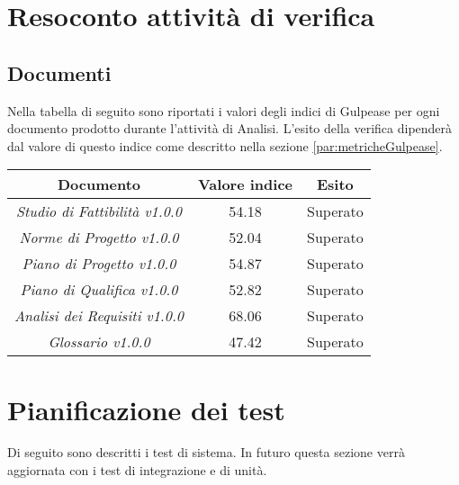 \documentclass{scalatekids-article}
\begin{document}
\section{Resoconto attività di verifica}
\label{sec:resAttivitaVerifica}
\subsection{Documenti}
Nella tabella di seguito sono riportati i valori degli indici di Gulpease per ogni documento prodotto durante l'attività di Analisi. L'esito della verifica dipenderà dal valore di questo indice come descritto nella sezione \ref{par:metricheGulpease}.
\begin{center}
  \begin{tabular}{| c | c | c |}
    \hline
    Documento & Valore indice & Esito\\
    \hline
    \textit{Studio di Fattibilità v1.0.0} & 54.18 & Superato\\
    \textit{Norme di Progetto v1.0.0} & 52.04 & Superato\\
    \textit{Piano di Progetto v1.0.0} & 54.87 & Superato\\
    \textit{Piano di Qualifica v1.0.0} & 52.82 & Superato\\
    \textit{Analisi dei Requisiti v1.0.0} & 68.06 & Superato\\
    \textit{Glossario v1.0.0} & 47.42 & Superato\\
    \hline
  \end{tabular}
\end{center}
\newpage
\section{Pianificazione dei test}
Di seguito sono descritti i test di sistema. In futuro questa sezione verrà aggiornata con i test di integrazione e di unità.
\end{document}

